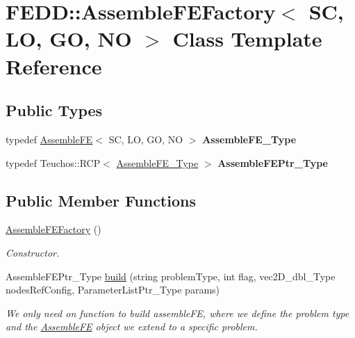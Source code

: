 \hypertarget{classFEDD_1_1AssembleFEFactory}{}\section{F\+E\+DD\+:\+:Assemble\+F\+E\+Factory$<$ SC, LO, GO, NO $>$ Class Template Reference}
\label{classFEDD_1_1AssembleFEFactory}
\subsection*{Public Types}
\begin{DoxyCompactItemize}
\item 
\mbox{\label{classFEDD_1_1AssembleFEFactory_a42c8b5387f23fea233cb2c9b2bfc379f}} 
typedef \hyperlink{classFEDD_1_1AssembleFE}{Assemble\+FE}$<$ SC, LO, GO, NO $>$ {\bfseries Assemble\+F\+E\+\_\+\+Type}
\item 
\mbox{\label{classFEDD_1_1AssembleFEFactory_aa7e0143080c2d0fbe8df0d26c55d6b5c}} 
typedef Teuchos\+::\+R\+CP$<$ \hyperlink{classFEDD_1_1AssembleFE}{Assemble\+F\+E\+\_\+\+Type} $>$ {\bfseries Assemble\+F\+E\+Ptr\+\_\+\+Type}
\end{DoxyCompactItemize}
\subsection*{Public Member Functions}
\begin{DoxyCompactItemize}
\item 
\mbox{\label{classFEDD_1_1AssembleFEFactory_a29b1ce08865f9d32e7011e208a4cebb9}} 
\hyperlink{classFEDD_1_1AssembleFEFactory_a29b1ce08865f9d32e7011e208a4cebb9}{Assemble\+F\+E\+Factory} ()
\begin{DoxyCompactList}\small\item\em Constructor. \end{DoxyCompactList}\item 
Assemble\+F\+E\+Ptr\+\_\+\+Type \hyperlink{classFEDD_1_1AssembleFEFactory_a5f861160b72d42ff386b82be8e58604e}{build} (string problem\+Type, int flag, vec2\+D\+\_\+dbl\+\_\+\+Type nodes\+Ref\+Config, Parameter\+List\+Ptr\+\_\+\+Type params)
\begin{DoxyCompactList}\small\item\em We only need on function to build assemble\+FE, where we define the problem type and the \hyperlink{classFEDD_1_1AssembleFE}{Assemble\+FE} object we extend to a specific problem. \end{DoxyCompactList}\end{DoxyCompactItemize}


